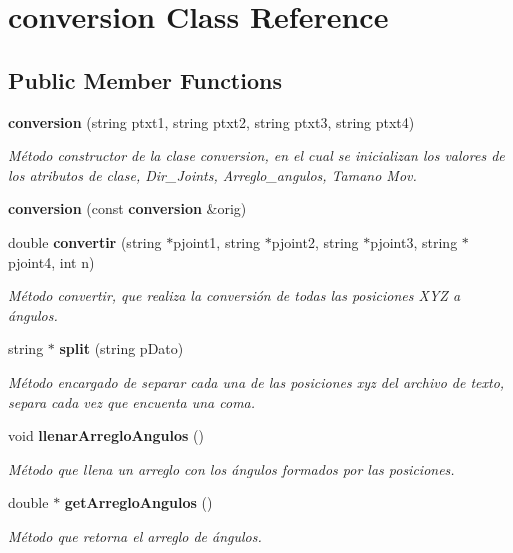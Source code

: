 \section{conversion Class Reference}
\label{classconversion}
\subsection*{Public Member Functions}
\begin{DoxyCompactItemize}
\item 
{\bf conversion} (string ptxt1, string ptxt2, string ptxt3, string ptxt4)
\begin{DoxyCompactList}\small\item\em Método constructor de la clase conversion, en el cual se inicializan los valores de los atributos de clase, Dir\-\_\-\-Joints, Arreglo\-\_\-angulos, Tamano Mov. \end{DoxyCompactList}\item 
{\bfseries conversion} (const {\bf conversion} \&orig)\label{classconversion_a69e0d1b5044f8290fa6dc59d7df145e4}

\item 
double {\bf convertir} (string $\ast$pjoint1, string $\ast$pjoint2, string $\ast$pjoint3, string $\ast$pjoint4, int n)
\begin{DoxyCompactList}\small\item\em Método convertir, que realiza la conversión de todas las posiciones X\-Y\-Z a ángulos. \end{DoxyCompactList}\item 
string $\ast$ {\bf split} (string p\-Dato)
\begin{DoxyCompactList}\small\item\em Método encargado de separar cada una de las posiciones xyz del archivo de texto, separa cada vez que encuenta una coma. \end{DoxyCompactList}\item 
void {\bf llenar\-Arreglo\-Angulos} ()
\begin{DoxyCompactList}\small\item\em Método que llena un arreglo con los ángulos formados por las posiciones. \end{DoxyCompactList}\item 
double $\ast$ {\bf get\-Arreglo\-Angulos} ()
\begin{DoxyCompactList}\small\item\em Método que retorna el arreglo de ángulos. \end{DoxyCompactList}\end{DoxyCompactItemize}
